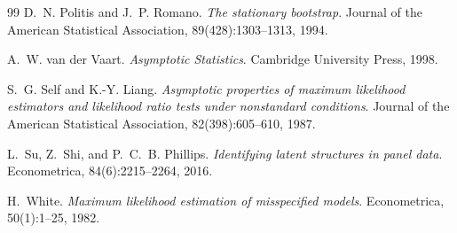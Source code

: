 \documentclass[11pt,letterpaper]{article}
\theoremstyle{remark}
\begin{document}
\begin{thebibliography}{99}
 D.~N. Politis and J.~P. Romano. \emph{The stationary bootstrap}. Journal of the American Statistical Association, 89(428):1303--1313, 1994.

 A.~W. van der Vaart. \emph{Asymptotic Statistics}. Cambridge University Press, 1998.

 S.~G. Self and K.-Y. Liang. \emph{Asymptotic properties of maximum likelihood estimators and likelihood ratio tests under nonstandard conditions}. Journal of the American Statistical Association, 82(398):605--610, 1987.

 L.~Su, Z.~Shi, and P.~C.~B. Phillips. \emph{Identifying latent structures in panel data}. Econometrica, 84(6):2215--2264, 2016.

 H.~White. \emph{Maximum likelihood estimation of misspecified models}. Econometrica, 50(1):1--25, 1982.

\end{thebibliography}
\end{document}
